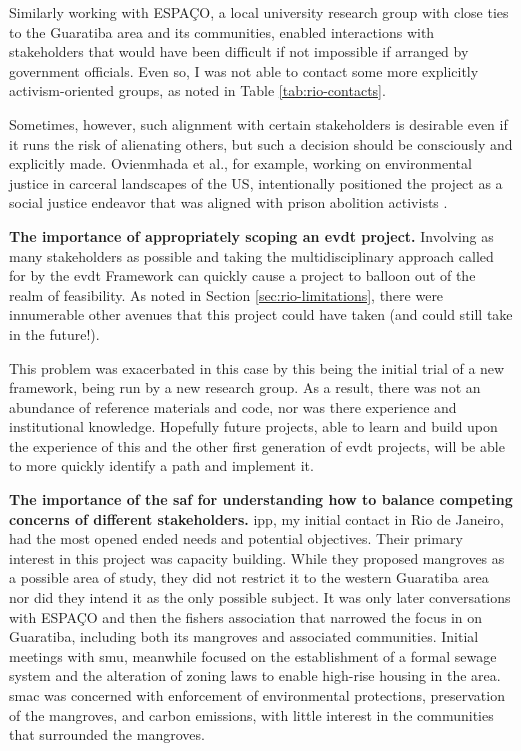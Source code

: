 Similarly working with ESPAÇO, a local university research group with close ties to the Guaratiba area and its communities, enabled interactions with stakeholders that would have been difficult if not impossible if arranged by government officials. Even so, I was not able to contact some more explicitly activism-oriented groups, as noted in Table \ref{tab:rio-contacts}.

Sometimes, however, such alignment with certain stakeholders is desirable even if it runs the risk of alienating others, but such a decision should be consciously and explicitly made. Ovienmhada et al., for example, working on environmental justice in carceral landscapes of the US, intentionally positioned the project as a social justice endeavor that was aligned with prison abolition activists \cite{ovienmhadaEnvironmentVulnerabilityDecisionTechnologyModelingFramework2021}. 

\textbf{The importance of appropriately scoping an \ac{evdt} project.} Involving as many stakeholders as possible and taking the multidisciplinary approach called for by the \ac{evdt} Framework can quickly cause a project to balloon out of the realm of feasibility. As noted in Section \ref{sec:rio-limitations}, there were innumerable other avenues that this project could have taken (and could still take in the future!). 

This problem was exacerbated in this case by this being the initial trial of a new framework, being run by a new research group. As a result, there was not an abundance of reference materials and code, nor was there experience and institutional knowledge. Hopefully future projects, able to learn and build upon the experience of this and the other first generation of \ac{evdt} projects, will be able to more quickly identify a path and implement it.

\textbf{The importance of the \ac{saf} for understanding how to balance competing concerns of different stakeholders.} \ac{ipp}, my initial contact in Rio de Janeiro, had the most opened ended needs and potential objectives. Their primary interest in this project was capacity building. While they proposed mangroves as a possible area of study, they did not restrict it to the western Guaratiba area nor did they intend it as the only possible subject. It was only later conversations with ESPAÇO and then the fishers association that narrowed the focus in on Guaratiba, including both its mangroves and associated communities. Initial meetings with \ac{smu}, meanwhile focused on the establishment of a formal sewage system and the alteration of zoning laws to enable high-rise housing in the area. \ac{smac} was concerned with enforcement of environmental protections, preservation of the mangroves, and carbon emissions, with little interest in the communities that surrounded the mangroves. 

